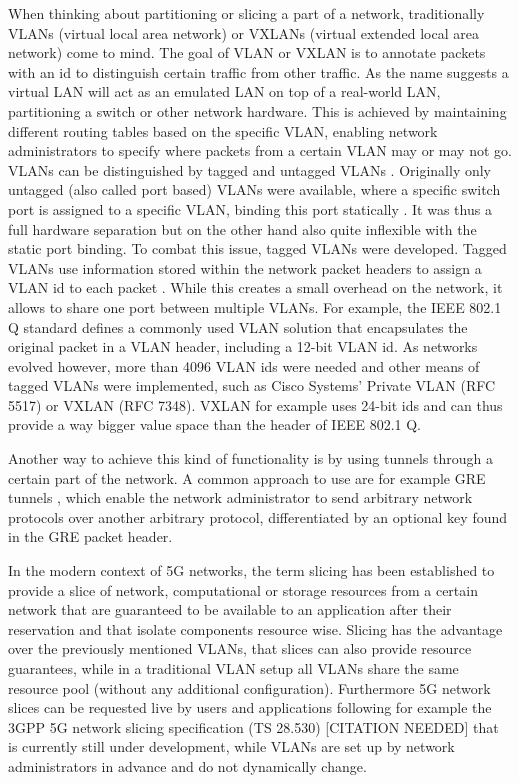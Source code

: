 \documentclass{article}
\begin{document}
When thinking about partitioning or slicing a part of a network, traditionally VLANs (virtual local area network) \cite{IEEE8021Q} or VXLANs (virtual extended local area network) \cite{rfc7348} come to mind. The goal of VLAN or VXLAN is to annotate packets with an id to distinguish certain traffic from other traffic. As the name suggests a virtual LAN will act as an emulated LAN on top of a real-world LAN, partitioning a switch or other network hardware. This is achieved by maintaining different routing tables based on the specific VLAN, enabling network administrators to specify where packets from a certain VLAN may or may not go. VLANs can be distinguished by tagged and untagged VLANs \cite[25.2]{IEEE8021Q}. Originally only untagged (also called port based) VLANs were available, where a specific switch port is assigned to a specific VLAN, binding this port statically \cite[25.3]{IEEE8021Q}. It was thus a full hardware separation but on the other hand also quite inflexible with the static port binding. To combat this issue, tagged VLANs were developed. Tagged VLANs use information stored within the network packet headers to assign a VLAN id to each packet \cite{IEEE8021Q}. While this creates a small overhead on the network, it allows to share one port between multiple VLANs. For example, the IEEE 802.1 Q standard defines a commonly used VLAN solution that encapsulates the original packet in a VLAN header, including a 12-bit VLAN id. As networks evolved however, more than 4096 VLAN ids were needed and other means of tagged VLANs were implemented, such as Cisco Systems' Private VLAN (RFC 5517) \cite{rfc5517} or VXLAN (RFC 7348). VXLAN for example uses 24-bit ids and can thus provide a way bigger value space than the header of IEEE 802.1 Q.

Another way to achieve this kind of functionality is by using tunnels through a certain part of the network. A common approach to use are for example GRE tunnels \cite{rfc2784}, which enable the network administrator to send arbitrary network protocols over another arbitrary protocol, differentiated by an optional key found in the GRE packet header.

In the modern context of 5G networks, the term slicing has been established to provide a slice of network, computational or storage resources from a certain network that are guaranteed to be available to an application after their reservation \cite{5G1,5G2,5G3,5G4} and that isolate components resource wise. Slicing has the advantage over the previously mentioned VLANs, that slices can also provide resource guarantees, while in a traditional VLAN setup all VLANs share the same resource pool (without any additional configuration). Furthermore 5G network slices can be requested live by users and applications following for example the 3GPP 5G network slicing specification (TS 28.530) [CITATION NEEDED] that is currently still under development, while VLANs are set up by network administrators in advance and do not dynamically change.
\end{document}
